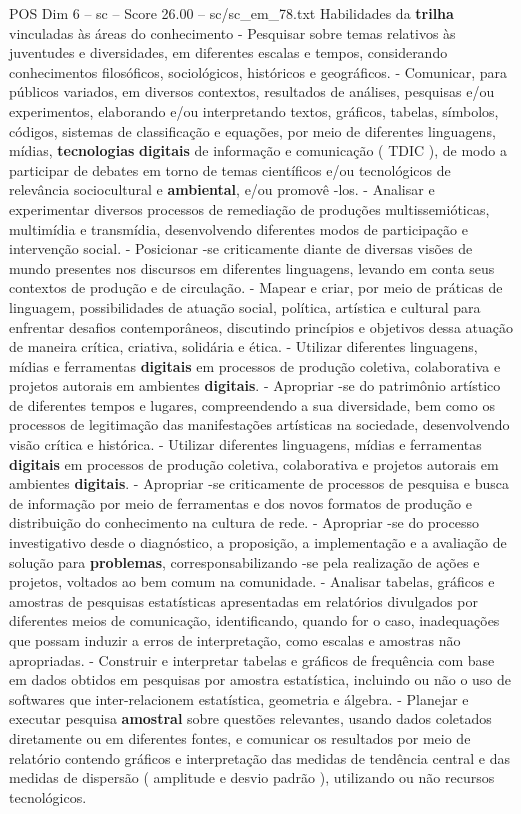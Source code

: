 \begin{textsample}{POS Dim 6 – sc – Score 26.00 – sc/sc\_em\_78.txt}
Habilidades da \textbf{trilha} vinculadas às áreas do conhecimento - Pesquisar sobre temas relativos às juventudes e diversidades, em diferentes escalas e tempos, considerando conhecimentos filosóficos, sociológicos, históricos e geográficos. - Comunicar, para públicos variados, em diversos contextos, resultados de análises, pesquisas e/ou experimentos, elaborando e/ou interpretando textos, gráficos, tabelas, símbolos, códigos, sistemas de classificação e equações, por meio de diferentes linguagens, mídias, \textbf{tecnologias} \textbf{digitais} de informação e comunicação ( TDIC ), de modo a participar de debates em torno de temas científicos e/ou tecnológicos de relevância sociocultural e \textbf{ambiental}, e/ou promovê -los. - Analisar e experimentar diversos processos de remediação de produções multissemióticas, multimídia e transmídia, desenvolvendo diferentes modos de participação e intervenção social. - Posicionar -se criticamente diante de diversas visões de mundo presentes nos discursos em diferentes linguagens, levando em conta seus contextos de produção e de circulação. - Mapear e criar, por meio de práticas de linguagem, possibilidades de atuação social, política, artística e cultural para enfrentar desafios contemporâneos, discutindo princípios e objetivos dessa atuação de maneira crítica, criativa, solidária e ética. - Utilizar diferentes linguagens, mídias e ferramentas \textbf{digitais} em processos de produção coletiva, colaborativa e projetos autorais em ambientes \textbf{digitais}. - Apropriar -se do patrimônio artístico de diferentes tempos e lugares, compreendendo a sua diversidade, bem como os processos de legitimação das manifestações artísticas na sociedade, desenvolvendo visão crítica e histórica. - Utilizar diferentes linguagens, mídias e ferramentas \textbf{digitais} em processos de produção coletiva, colaborativa e projetos autorais em ambientes \textbf{digitais}. - Apropriar -se criticamente de processos de pesquisa e busca de informação por meio de ferramentas e dos novos formatos de produção e distribuição do conhecimento na cultura de rede. - Apropriar -se do processo investigativo desde o diagnóstico, a proposição, a implementação e a avaliação de solução para \textbf{problemas}, corresponsabilizando -se pela realização de ações e projetos, voltados ao bem comum na comunidade. - Analisar tabelas, gráficos e amostras de pesquisas estatísticas apresentadas em relatórios divulgados por diferentes meios de comunicação, identificando, quando for o caso, inadequações que possam induzir a erros de interpretação, como escalas e amostras não apropriadas. - Construir e interpretar tabelas e gráficos de frequência com base em dados obtidos em pesquisas por amostra estatística, incluindo ou não o uso de softwares que inter-relacionem estatística, geometria e álgebra. - Planejar e executar pesquisa \textbf{amostral} sobre questões relevantes, usando dados coletados diretamente ou em diferentes fontes, e comunicar os resultados por meio de relatório contendo gráficos e interpretação das medidas de tendência central e das medidas de dispersão ( amplitude e desvio padrão ), utilizando ou não recursos tecnológicos.

\end{textsample}
